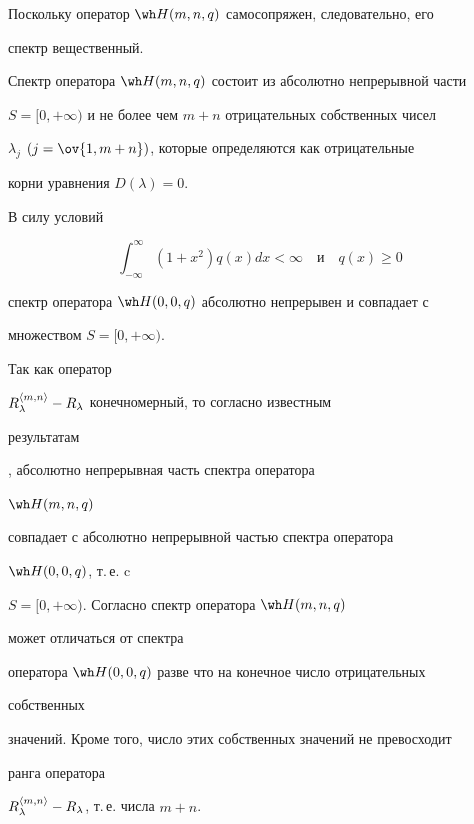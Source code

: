  


Поскольку оператор $\wh H(m,n,q)$ самосопряжен, следовательно, его 


спектр вещественный. 


 


\begin{thm} 


Спектр оператора $\wh H(m,n,q)$ состоит из абсолютно непрерывной части 


$S=[0,+\infty)$ и не более чем $m+n$ отрицательных собственных чисел 


$\lambda_j$ $(j=\ov{1,m+n})$, которые определяются как отрицательные 


корни уравнения $D(\lambda)=0$. 


\end{thm} 


 


\begin{pf} 


В силу условий 


$$ 


\int^\infty_{-\infty}(1+x^2)q(x)dx<\infty\quad 


\text{и} 


\quad q(x)\ge 0 


$$ 


спектр оператора $\wh H(0,0,q)$ абсолютно непрерывен и совпадает с 


множеством $S=[0,+\infty)$. 


Так как оператор 


$R^{\langle m,n\rangle}_\lambda-R_\lambda$ конечномерный, то согласно известным 


результатам 


\cite{3}, \cite{4} абсолютно непрерывная часть спектра оператора 


$\wh H(m,n,q)$ 


совпадает с абсолютно непрерывной частью спектра оператора 


$\wh H(0,0,q)$, т.\,е. c 


$S=[0,+\infty)$. Согласно \cite{5} спектр оператора $\wh H(m,n,q)$ 


может отличаться от спектра 


оператора $\wh H(0,0,q)$ разве что на конечное число отрицательных 


собственных 


значений. Кроме того, число этих собственных значений не превосходит 


ранга оператора 


$R^{\langle m,n\rangle}_\lambda-R_\lambda$, т.\,е. числа $m+n$. 


\end{pf} 


